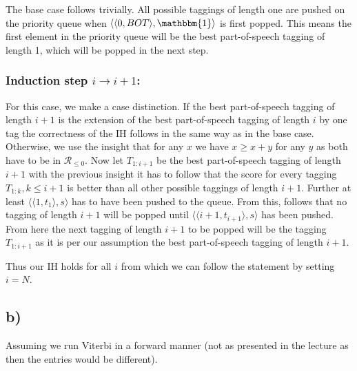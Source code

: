 \documentclass[a4paper,12pt]{ETHexercise}
\begin{document}
The base case follows trivially. All possible taggings of length one are pushed on the priority queue when $\langle \langle 0, BOT \rangle, \mathbbm{1} \rangle$ is first popped. This means the first element in the priority queue will be the best part-of-speech tagging of length 1, which will be popped in the next step.

\subsubsection*{Induction step $i \rightarrow i+1$:}

For this case, we make a case distinction. If the best part-of-speech tagging of length $i+1$ is the extension of the best part-of-speech tagging of length $i$ by one tag the correctness of the IH follows in the same way as in the base case.
Otherwise, we use the insight that for any $x$ we have $x \geq x+y$ for any $y$ as both have to be in $\mathcal{R}_{\leq 0}$.
Now let $T_{1:i+1}$ be the best part-of-speech tagging of length $i+1$ with the previous insight it has to follow that the score for every tagging $T_{1:k}, k \leq i+1$ is better than all other possible taggings of length $i+1$. Further at least $\langle \langle 1, t_1 \rangle, s \rangle$ has to have been pushed to the queue. From this, follows that no tagging of length $i+1$ will be popped until $\langle \langle i+1, t_{i+1} \rangle, s \rangle$ has been pushed. From here the next tagging of length $i+1$ to be popped will be the tagging $T_{1:i+1}$ as it is per our assumption the best part-of-speech tagging of length $i+1$.

Thus our IH holds for all $i$ from which we can follow the statement by setting $i = N$.

\subsection*{b)}
Assuming we run Viterbi in a forward manner (not as presented in the lecture as then the entries would be different).
\end{document}
